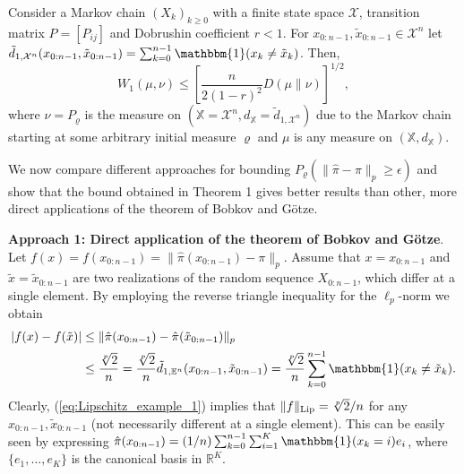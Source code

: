 \documentclass[twoside,11pt]{article}
\begin{document}
\begin{theorem}\label{thm:Marton} 
 Consider a Markov chain $(X_k)_{k\geq 0}$ with a finite state space $\mathcal{X}$, transition matrix $P=[P_{ij}]$ and Dobrushin coefficient $r<1$. 
For $x_{0:n-1},\tilde{x}_{0:n-1}\in \mathcal{X}^{n}$ let $
\tilde{d}_{1,\mathcal{X}^{n}}(x_{0:n-1},\tilde{x}_{0:n-1})=\sum_{k=0}^{n-1}\mathbbm{1}(x_k\neq \tilde{x}_k)$. 
Then, 
\[
W_{1}\left(\mu,\nu\right)\leq \left[\frac{n}{2(1-r)^2}D(\mu\| \nu)\right]^{1/2},
\]
where $\nu=P_{\varrho}$ is the measure on $(\mathbb{X}=\mathcal{X}^{n},d_{\mathbb{X}}=\tilde{d}_{1,\mathcal{X}^{n}})$ due to the Markov chain  starting at some arbitrary initial measure $\varrho$ and $\mu$ is any  measure on $(\mathbb{X},d_{\mathbb{X}})$.
\end{theorem}

We now compare different approaches for bounding $P_{\varrho}(\|\hat{\pi}-\pi\|_{p}\geq \epsilon)$ and show that the bound obtained in Theorem 1 gives better results than other, more direct applications of the theorem of Bobkov and G\"{o}tze.

\noindent\textbf{Approach 1: Direct application of the theorem of Bobkov and G\"{o}tze}. Let $f(x)=f(x_{0:n-1})=\|\hat{\pi}(x_{0:n-1})-\pi\|_{p}$.  Assume that $x=x_{0:n-1}$ and $\tilde{x}=\tilde{x}_{0:n-1}$ are two realizations of the random sequence $X_{0:n-1}$, which differ at a single element. By employing the reverse triangle inequality for the $\ell_p$-norm we obtain
\begin{align}\label{eq:Lipschitz_example_1}
\left|f(x)-f(\tilde{x})\right|&\leq \|\hat{\pi}(x_{0:n-1})-\hat{\pi}(\tilde{x}_{0:n-1})\|_{p}\nonumber\\&\leq \frac{\sqrt[p]{2}}{n}= \frac{\sqrt[p]{2}}{n} \tilde{d}_{1,\mathbb{E}^n}(x_{0:n-1},\tilde{x}_{0:n-1})=\frac{\sqrt[p]{2}}{n} \sum_{k=0}^{n-1}\mathbbm{1}(x_k\neq \tilde{x}_k).
\end{align} 
Clearly, (\ref{eq:Lipschitz_example_1}) implies that $\|f\|_{\rm Lip}=\sqrt[p]{2}/n$ for any $x_{0:n-1},\tilde{x}_{0:n-1}$ (not necessarily different at a single element). This can be easily seen by expressing $\hat{\pi}(x_{0:n-1})=(1/n)\sum_{k=0}^{n-1}\sum_{i=1}^{K}\mathbbm{1}(x_{k}=i)e_i$, where $\{e_1,\ldots, e_K\}$ is the canonical basis in $\mathbb{R}^K$. 
\end{document}
